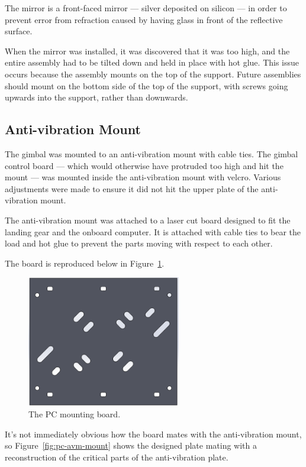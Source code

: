 \documentclass[12pt,oneside,a4paper]{book}
\begin{document}
The mirror is a front-faced mirror --- silver deposited on silicon ---
in order to prevent error from refraction caused by having glass in
front of the reflective surface.

When the mirror was installed, it was discovered that it was too high,
and the entire assembly had to be tilted down and held in place with
hot glue. This issue occurs because the assembly mounts on the top of
the support. Future assemblies should mount on the bottom side of the
top of the support, with screws going upwards into the support, rather
than downwards.

\newpage
\subsection{Anti-vibration Mount}
\label{sec:attach-hexac-land}

The gimbal was mounted to an anti-vibration mount with cable
ties. The gimbal control board --- which would otherwise have
protruded too high and hit the mount --- was mounted inside the
anti-vibration mount with velcro. Various adjustments were made to
ensure it did not hit the upper plate of the anti-vibration mount.

The anti-vibration mount was attached to a laser cut board designed to
fit the landing gear and the onboard computer. It is attached with
cable ties to bear the load and hot glue to prevent the parts moving
with respect to each other.

The board is reproduced below in Figure~\ref{fig:pc-mount}.

\begin{figure}[h]
  \centering
    \includegraphics[width=0.6\textwidth]{figs/pc-mount}
  \caption{The PC mounting board.}
  \label{fig:pc-mount}
\end{figure}

It's not immediately obvious how the board mates with the
anti-vibration mount, so Figure~\ref{fig:pc-avm-mount} shows the
designed plate mating with a reconstruction of the critical parts of
the anti-vibration plate.
\end{document}
